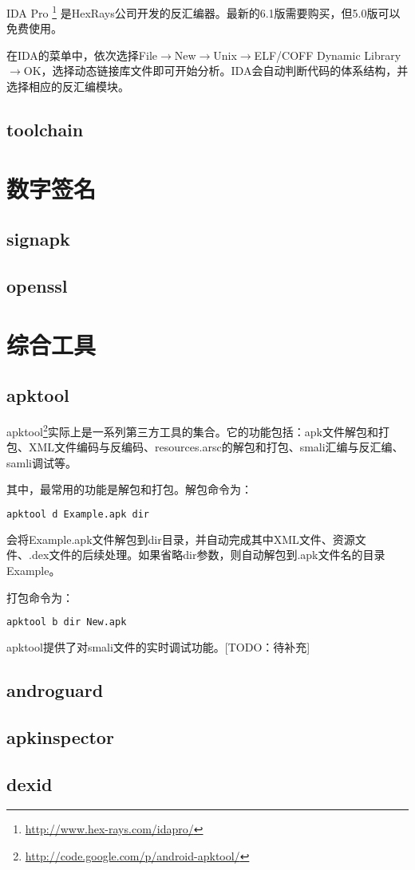 IDA Pro
\footnote{\url{http://www.hex-rays.com/idapro/}}
是Hex\-Rays公司开发的反汇编器。最新的6.1版需要购买，但5.0版可以免费使用。

在IDA的菜单中，依次选择File$\rightarrow$New$\rightarrow$Unix$\rightarrow$ELF/COFF Dynamic Library$\rightarrow$OK，选择动态链接库文件即可开始分析。IDA会自动判断代码的体系结构，并选择相应的反汇编模块。
\subsection{toolchain}

\section{数字签名}
\subsection{signapk}
\subsection{openssl}

\section{综合工具}
\subsection{apktool}
apktool\footnote{\url{http://code.google.com/p/android-apktool/}}实际上是一系列第三方工具的集合。它的功能包括：apk文件解包和打包、XML文件编码与反编码、resources.arsc的解包和打包、smali汇编与反汇编、samli调试等。

其中，最常用的功能是解包和打包。解包命令为：
\begin{lstlisting}[language=bash, numbers=none]
apktool d Example.apk dir
\end{lstlisting}
会将Example.apk文件解包到dir目录，并自动完成其中XML文件、资源文件、.dex文件的后续处理。如果省略dir参数，则自动解包到.apk文件名的目录Example。

打包命令为：
\begin{lstlisting}[language=bash, numbers=none]
apktool b dir New.apk
\end{lstlisting}

apktool提供了对smali文件的实时调试功能。[TODO：待补充]
\subsection{androguard}
\subsection{apkinspector}
\subsection{dexid}

